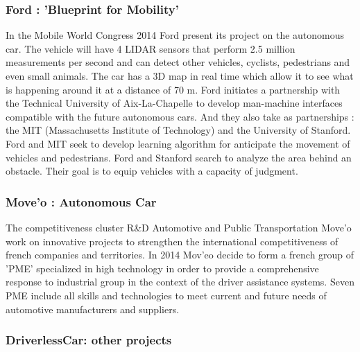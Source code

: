 \documentclass[a4paper]{article}
\begin{document}
\subsubsection{Ford : 'Blueprint for Mobility'}

In the Mobile World Congress 2014 Ford present its project on the autonomous car. The vehicle will have 4 LIDAR sensors that perform 2.5 million measurements per second and can detect other vehicles, cyclists, pedestrians and even small animals. The car has a 3D map in real time which allow it to see what is happening around it at a distance of 70 m. Ford initiates a partnership with the Technical University of Aix-La-Chapelle to develop man-machine interfaces compatible with the future autonomous cars. And they also take as partnerships : the MIT (Massachusetts Institute of Technology) and the University of Stanford. Ford and MIT seek to develop learning algorithm for anticipate the movement of vehicles and pedestrians. Ford and Stanford search to analyze the area behind an obstacle. Their goal is to equip vehicles with a capacity of judgment. 


\newpage

\subsubsection{Move'o : Autonomous Car}

The competitiveness cluster R\&D Automotive and Public Transportation Move'o work on innovative projects to strengthen the international competitiveness of french companies and territories. In 2014 Mov'eo decide to form a french group of 'PME' specialized in high technology in order to provide a comprehensive response to industrial group in the context of the driver assistance systems. Seven PME include all skills and technologies to meet current and future needs of automotive manufacturers and suppliers.

\subsubsection{DriverlessCar: other projects}
\end{document}
